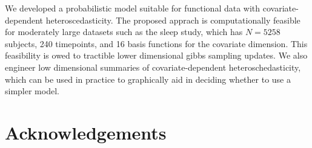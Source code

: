 \documentclass[useAMS,referee,usenatbib]{biom}
\begin{document}
We developed a probabilistic model suitable for functional data with covariate-dependent heteroscedasticity. The proposed apprach is computationally feasible for moderately large datasets such as the sleep study, which has $N = 5258$ subjects, 240 timepoints, and 16 basis functions for the covariate dimension. This feasibility is owed to tractible lower dimensional gibbs sampling updates. We also engineer low dimensional summaries of covariate-dependent heteroschedasticity, which can be used in practice to graphically aid in deciding whether to use a simpler model. 


\backmatter


\section*{Acknowledgements}





%
%   
% 
\end{document}
